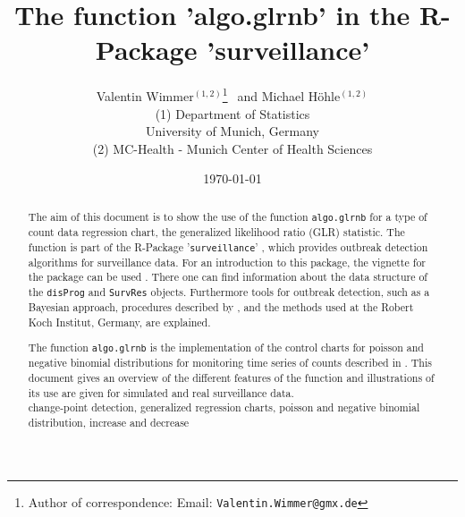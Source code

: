 \documentclass[a4paper,11pt]{article}
\title{The function 'algo.glrnb' in the R-Package 'surveillance'}
\author{
Valentin Wimmer$^{(1,2)}$\thanks{Author of correspondence: Email: \texttt{Valentin.Wimmer@gmx.de}}$\>\>$ and Michael H\"{o}hle$^{(1,2)}$ \\
(1) Department of Statistics\\
University of Munich, Germany\\
(2) MC-Health - Munich Center of Health Sciences
} \date{\today}
\begin{document}








\maketitle  

\begin{abstract}
  \noindent The aim of this document is to show the use of the function \verb+algo.glrnb+ for a type of count data regression chart, the generalized likelihood ratio (GLR) statistic. The function is part of the R-Package '\texttt{surveillance}' \citep{hoehle2007R}, which provides outbreak detection algorithms for surveillance data. For an introduction to this package, the vignette for the package can be used \citep{vignette}. There one can find information about the data structure of the \verb+disProg+ and \verb+SurvRes+ objects. Furthermore tools for outbreak detection, such as a Bayesian approach, procedures described by \citet{stroup89},
  \citet{farrington96} and the methods used at the Robert Koch Institut, Germany, are explained. 
  
  The function \verb+algo.glrnb+ is the implementation of the control charts for poisson and negative binomial distributions for monitoring time series of counts described in \citet{hoehle2008}. This document gives an overview of the different features of the function and illustrations of its use are given for simulated and real surveillance data. \\
  
     change-point detection, generalized regression charts, poisson and negative binomial distribution, increase and decrease
\end{abstract}
\end{document}
